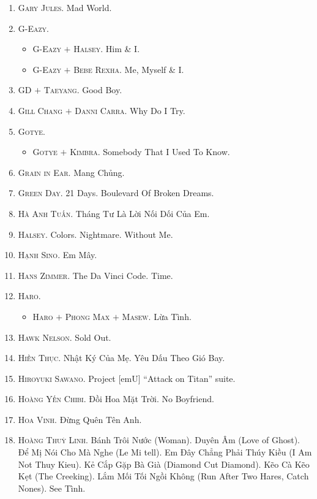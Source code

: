 \documentclass[oneside]{book}
\numberwithin{equation}{section}
\begin{document}
\begin{enumerate}
	\item \textsc{Gary Jules.} Mad World.
	\item \textsc{G-Eazy.}
	\begin{itemize}
		\item \textsc{G-Eazy $+$ Halsey.} Him \& I.
		\item \textsc{G-Eazy $+$ Bebe Rexha.} Me, Myself \& I.
	\end{itemize}	
	\item \textsc{GD $+$ Taeyang.} Good Boy.
	\item \textsc{Gill Chang $+$ Danni Carra.} Why Do I Try.
	\item \textsc{Gotye.}
	\begin{itemize}
		\item \textsc{Gotye $+$ Kimbra.} Somebody That I Used To Know.
	\end{itemize}
	\item \textsc{Grain in Ear.} Mang Chủng.
	\item \textsc{Green Day.} 21 Days. Boulevard Of Broken Dreams.
	\item \textsc{Hà Anh Tuấn.} Tháng Tư Là Lời Nối Dối Của Em.
	\item \textsc{Halsey.} Colors. Nightmare. Without Me.
	\item \textsc{Hạnh Sino.} Em Mây.
	\item \textsc{Hans Zimmer.} The Da Vinci Code. Time.
	\item \textsc{Haro.}
	\begin{itemize}
		\item \textsc{Haro $+$ Phong Max $+$ Masew.} Lừa Tình.
	\end{itemize}
	\item \textsc{Hawk Nelson.} Sold Out.
	\item \textsc{Hiền Thục.} Nhật Ký Của Mẹ. Yêu Dấu Theo Gió Bay.
	\item \textsc{Hiroyuki Sawano.} Project [emU] ``Attack on Titan'' suite.
	\item \textsc{Hoàng Yến Chibi.} Đồi Hoa Mặt Trời. No Boyfriend.
	\item \textsc{Hoa Vinh.} Đừng Quên Tên Anh.
	\item \textsc{Hoàng Thuỳ Linh.} Bánh Trôi Nước (Woman). Duyên Âm (Love of Ghost). Để Mị Nói Cho Mà Nghe (Le Mi tell). Em Đây Chẳng Phải Thúy Kiều (I Am Not Thuy Kieu). Kẻ Cắp Gặp Bà Già (Diamond Cut Diamond). Kẽo Cà Kẽo Kẹt (The Creeking). Lắm Mối Tối Ngồi Không (Run After Two Hares, Catch Nones). See Tình.
	\begin{itemize}

\end{itemize}
\end{enumerate}
\end{document}

